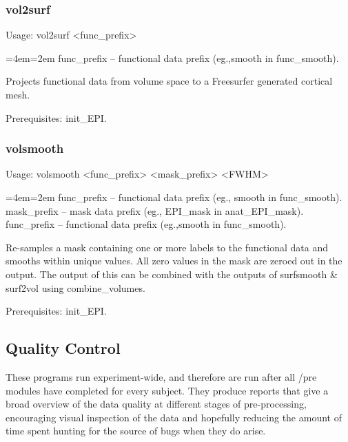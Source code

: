 \documentclass[final,titlepage,letterpaper,oneside,12pt]{article}
\renewcommand{\texttt}[2][BrickRed]{\textcolor{#1}{\ttfamily #2}}%
\newenvironment{blockquote}{%
  \par%
  \medskip
  \leftskip=4em\rightskip=2em%
  \noindent\ignorespaces}{%
  \par\medskip}
\begin{document}
\subsubsection{vol2surf}
Usage: \texttt{vol2surf <func\_prefix>}

\begin{blockquote}
func\_prefix -- functional data prefix (eg.,smooth in func\_smooth).
\end{blockquote}

\noindent Projects functional data from volume space to a Freesurfer generated cortical mesh.

Prerequisites: \texttt{init\_EPI}.

\subsubsection{volsmooth}
Usage: \texttt{volsmooth <func\_prefix> <mask\_prefix> <FWHM>}

\begin{blockquote}
func\_prefix -- functional data prefix (eg., smooth in func\_smooth).
mask\_prefix -- mask data prefix (eg., EPI\_mask in anat\_EPI\_mask).
func\_prefix -- functional data prefix (eg.,smooth in func\_smooth).
\end{blockquote}

\noindent Re-samples a mask containing one or more labels to the functional data and smooths within unique values. All zero values in the mask are zeroed out in the output. The output of this can be combined with the outputs of \texttt{surfsmooth} \& \texttt{surf2vol} using \texttt{combine\_volumes}.

Prerequisites: \texttt{init\_EPI}.

\subsection{Quality Control}

These programs run experiment-wide, and therefore are run after all \texttt{/pre} modules have completed for every subject. They produce reports that give a broad overview of the data quality at different stages of pre-processing, encouraging visual inspection of the data and hopefully reducing the amount of time spent hunting for the source of bugs when they do arise.
\end{document}
